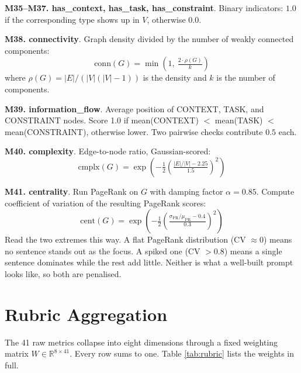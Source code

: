 \documentclass[conference]{IEEEtran}
\begin{document}
\textbf{M35--M37. has\_context, has\_task, has\_constraint}. Binary indicators: $1.0$ if the corresponding type shows up in $V$, otherwise $0.0$.

\textbf{M38. connectivity}. Graph density divided by the number of weakly connected components:
\[ \mathrm{conn}(G) = \min(1,\ \tfrac{2 \cdot \rho(G)}{k}) \]
where $\rho(G) = |E| / (|V|(|V|-1))$ is the density and $k$ is the number of components.

\textbf{M39. information\_flow}. Average position of CONTEXT, TASK, and CONSTRAINT nodes. Score 1.0 if mean(CONTEXT) $<$ mean(TASK) $<$ mean(CONSTRAINT), otherwise lower. Two pairwise checks contribute $0.5$ each.

\textbf{M40. complexity}. Edge-to-node ratio, Gaussian-scored:
\[ \mathrm{cmplx}(G) = \exp\!\left(-\tfrac{1}{2}\left(\tfrac{|E|/|V| - 2.25}{1.5}\right)^2\right) \]

\textbf{M41. centrality}. Run PageRank \cite{pagerank} on $G$ with damping factor $\alpha = 0.85$. Compute coefficient of variation of the resulting PageRank scores:
\[ \mathrm{cent}(G) = \exp\!\left(-\tfrac{1}{2}\left(\tfrac{\sigma_{\text{PR}}/\mu_{\text{PR}} - 0.4}{0.3}\right)^2\right) \]
Read the two extremes this way. A flat PageRank distribution (CV $\approx 0$) means no sentence stands out as the focus. A spiked one (CV $> 0.8$) means a single sentence dominates while the rest add little. Neither is what a well-built prompt looks like, so both are penalised.

\section{Rubric Aggregation}

The 41 raw metrics collapse into eight dimensions through a fixed weighting matrix $W \in \mathbb{R}^{8 \times 41}$. Every row sums to one. Table \ref{tab:rubric} lists the weights in full.
\end{document}
